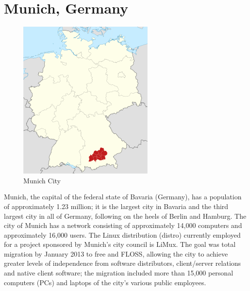 \section {Munich, Germany  }
\begin{figure}[H]
\centering
    \includegraphics[scale=0.8]{img/munich.png} 
  \caption{Munich City}
    \end{figure}

Munich, the capital of the federal state of Bavaria (Germany), has a population of approximately 1.23 million; it is the largest city in Bavaria and the third largest city in all of Germany, following on the heels of Berlin and Hamburg. The city of Munich has a network consisting of approximately 14,000 computers and approximately 16,000 users. The Linux distribution (distro) currently employed for a project sponsored by Munich’s city council is LiMux. The goal was total migration by January 2013 to free and FLOSS, allowing the city to achieve greater levels of independence from software distributors, client/server relations and native client software; the migration included more than 15,000 personal computers (PCs) and laptops of the city’s various public employees.

